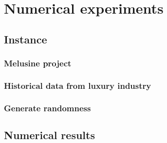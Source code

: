 \chapter{Numerical experiments}


\section{Instance}

\subsection{Melusine project}


\subsection{Historical data from luxury industry}


\subsection{Generate randomness}



\section{Numerical results}


